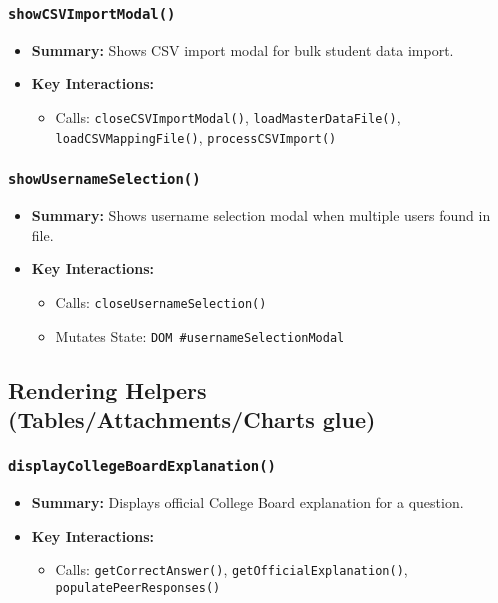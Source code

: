 \documentclass[11pt,letterpaper]{article}
\begin{document}
\subsubsection{\texttt{showCSVImportModal()}}
\begin{itemize}
    \item \textbf{Summary:} Shows CSV import modal for bulk student data import.
    \item \textbf{Key Interactions:}
    \begin{itemize}
        \item Calls: \texttt{closeCSVImportModal()}, \texttt{loadMasterDataFile()}, \texttt{loadCSVMappingFile()}, \texttt{processCSVImport()}
    \end{itemize}
\end{itemize}

\subsubsection{\texttt{showUsernameSelection()}}
\begin{itemize}
    \item \textbf{Summary:} Shows username selection modal when multiple users found in file.
    \item \textbf{Key Interactions:}
    \begin{itemize}
        \item Calls: \texttt{closeUsernameSelection()}
        \item Mutates State: \texttt{DOM \#usernameSelectionModal}
    \end{itemize}
\end{itemize}

\subsection{Rendering Helpers (Tables/Attachments/Charts glue)}

\subsubsection{\texttt{displayCollegeBoardExplanation()}}
\begin{itemize}
    \item \textbf{Summary:} Displays official College Board explanation for a question.
    \item \textbf{Key Interactions:}
    \begin{itemize}
        \item Calls: \texttt{getCorrectAnswer()}, \texttt{getOfficialExplanation()}, \texttt{populatePeerResponses()}
    \end{itemize}
\end{itemize}
\end{document}
